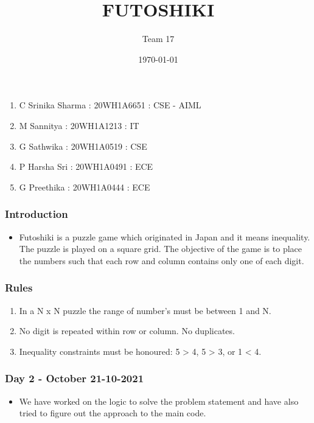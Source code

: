 \documentclass[14pt]{beamer}
\title{FUTOSHIKI}
\subtitle{Team 17}
\date{\today}
\begin{document}
  
  \begin{frame}
        \titlepage
    \end{frame}
  \begin{frame}
	\begin{enumerate}
		\item C Srinika Sharma : 20WH1A6651 : CSE - AIML
		\item M Sannitya : 20WH1A1213 : IT 
		\item G Sathwika : 20WH1A0519 : CSE
		\item P Harsha Sri : 20WH1A0491 : ECE
		\item G Preethika : 20WH1A0444 : ECE
	\end{enumerate}
  \end{frame}


  \begin{frame}
	\frametitle{Introduction}
        
	\begin{itemize}
	    \item Futoshiki is a puzzle game which originated in Japan and it means inequality. The puzzle is played on a square grid. The objective of the game is to place the numbers such that each row and column contains only one of each digit.
	\end{itemize}
	
  \end{frame}
   \begin{frame}
	\frametitle{Rules}

	\begin{enumerate}
	    \item In a N x N puzzle the range of number's must be between 1 and N.  
	    \item No digit is repeated within row or column. No duplicates. 
	    \item Inequality constraints must be honoured: 5 > 4, 5 > 3, or 1 < 4.
	\end{enumerate}
  \end{frame}
 
   
  \begin{frame}
	\frametitle{Day 2 - October 21-10-2021}
        
	\begin{itemize}
	    \item We have worked on the logic to solve the problem statement and have also tried to figure out the approach to the main code. 
	\end{itemize}
	
  \end{frame}
\end{document}
